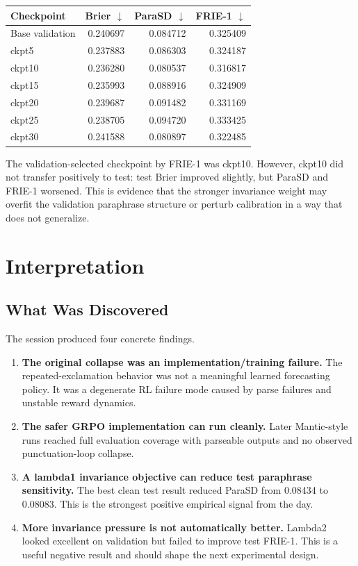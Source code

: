 \documentclass[11pt]{article}
\begin{document}
\begin{center}
\begin{tabular}{lrrr}
\toprule
Checkpoint & Brier $\downarrow$ & ParaSD $\downarrow$ & FRIE-1 $\downarrow$ \\
\midrule
Base validation & 0.240697 & 0.084712 & 0.325409 \\
ckpt5 & 0.237883 & 0.086303 & 0.324187 \\
ckpt10 & 0.236280 & 0.080537 & 0.316817 \\
ckpt15 & 0.235993 & 0.088916 & 0.324909 \\
ckpt20 & 0.239687 & 0.091482 & 0.331169 \\
ckpt25 & 0.238705 & 0.094720 & 0.333425 \\
ckpt30 & 0.241588 & 0.080897 & 0.322485 \\
\bottomrule
\end{tabular}
\end{center}

The validation-selected checkpoint by FRIE-1 was ckpt10. However, ckpt10 did not
transfer positively to test: test Brier improved slightly, but ParaSD and FRIE-1
worsened. This is evidence that the stronger invariance weight may overfit the
validation paraphrase structure or perturb calibration in a way that does not
generalize.

\section{Interpretation}

\subsection{What Was Discovered}

The session produced four concrete findings.

\begin{enumerate}
  \item \textbf{The original collapse was an implementation/training failure.}
  The repeated-exclamation behavior was not a meaningful learned forecasting
  policy. It was a degenerate RL failure mode caused by parse failures and
  unstable reward dynamics.

  \item \textbf{The safer GRPO implementation can run cleanly.} Later
  Mantic-style runs reached full evaluation coverage with parseable outputs and
  no observed punctuation-loop collapse.

  \item \textbf{A lambda1 invariance objective can reduce test paraphrase
  sensitivity.} The best clean test result reduced ParaSD from 0.08434 to
  0.08083. This is the strongest positive empirical signal from the day.

  \item \textbf{More invariance pressure is not automatically better.} Lambda2
  looked excellent on validation but failed to improve test FRIE-1. This is a
  useful negative result and should shape the next experimental design.
\end{enumerate}
\end{document}

